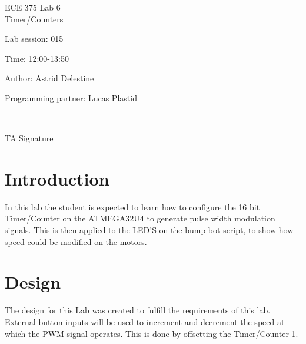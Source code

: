 \documentclass[12pt,letterpaper]{article}
\begin{document}
\begin{titlepage}
    \vspace*{4cm}
    \begin{flushright}
    {\huge
        ECE 375 Lab 6\\[1cm]
    }
    {\large
    	Timer/Counters
    }
    \end{flushright}
    \begin{flushleft}
    Lab session: 015
    
    Time: 12:00-13:50
    \end{flushleft}
    \begin{flushright}
    Author: Astrid Delestine

    Programming partner: Lucas Plastid 

    \vfill
    \rule{5in}{.5mm}\\
    TA Signature
    \end{flushright}

\end{titlepage}

\section{Introduction}
In this lab the student is expected to learn how to configure the 16 bit Timer/Counter on the ATMEGA32U4 to generate pulse width modulation signals. This is then applied to the LED'S on the bump bot script, to show how speed could be modified on the motors.


\section{Design}
The design for this Lab was created to fulfill the requirements of this lab. External button inputs will be used to increment and decrement the speed at which the PWM signal operates. This is done by offsetting the Timer/Counter 1.
\end{document}
